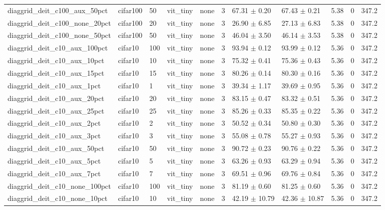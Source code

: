 \begin{tabular}{lllllllllll}
diaggrid_deit_c100_aux_50pct & cifar100 & 50 & vit_tiny & none & 3 & 67.31 $\pm$ 0.20 & 67.43 $\pm$ 0.21 & 5.38 & 0 & 347.2 \\
diaggrid_deit_c100_none_20pct & cifar100 & 20 & vit_tiny & none & 3 & 26.90 $\pm$ 6.85 & 27.13 $\pm$ 6.83 & 5.38 & 0 & 347.2 \\
diaggrid_deit_c100_none_50pct & cifar100 & 50 & vit_tiny & none & 3 & 46.04 $\pm$ 3.50 & 46.14 $\pm$ 3.53 & 5.38 & 0 & 347.2 \\
diaggrid_deit_c10_aux_100pct & cifar10 & 100 & vit_tiny & none & 3 & 93.94 $\pm$ 0.12 & 93.99 $\pm$ 0.12 & 5.36 & 0 & 347.2 \\
diaggrid_deit_c10_aux_10pct & cifar10 & 10 & vit_tiny & none & 3 & 75.32 $\pm$ 0.41 & 75.36 $\pm$ 0.43 & 5.36 & 0 & 347.2 \\
diaggrid_deit_c10_aux_15pct & cifar10 & 15 & vit_tiny & none & 3 & 80.26 $\pm$ 0.14 & 80.30 $\pm$ 0.16 & 5.36 & 0 & 347.2 \\
diaggrid_deit_c10_aux_1pct & cifar10 & 1 & vit_tiny & none & 3 & 39.34 $\pm$ 1.17 & 39.69 $\pm$ 0.95 & 5.36 & 0 & 347.2 \\
diaggrid_deit_c10_aux_20pct & cifar10 & 20 & vit_tiny & none & 3 & 83.15 $\pm$ 0.47 & 83.32 $\pm$ 0.51 & 5.36 & 0 & 347.2 \\
diaggrid_deit_c10_aux_25pct & cifar10 & 25 & vit_tiny & none & 3 & 85.26 $\pm$ 0.33 & 85.35 $\pm$ 0.22 & 5.36 & 0 & 347.2 \\
diaggrid_deit_c10_aux_2pct & cifar10 & 2 & vit_tiny & none & 3 & 50.52 $\pm$ 0.34 & 50.80 $\pm$ 0.30 & 5.36 & 0 & 347.2 \\
diaggrid_deit_c10_aux_3pct & cifar10 & 3 & vit_tiny & none & 3 & 55.08 $\pm$ 0.78 & 55.27 $\pm$ 0.93 & 5.36 & 0 & 347.2 \\
diaggrid_deit_c10_aux_50pct & cifar10 & 50 & vit_tiny & none & 3 & 90.72 $\pm$ 0.23 & 90.76 $\pm$ 0.22 & 5.36 & 0 & 347.2 \\
diaggrid_deit_c10_aux_5pct & cifar10 & 5 & vit_tiny & none & 3 & 63.26 $\pm$ 0.93 & 63.29 $\pm$ 0.94 & 5.36 & 0 & 347.2 \\
diaggrid_deit_c10_aux_7pct & cifar10 & 7 & vit_tiny & none & 3 & 69.51 $\pm$ 0.96 & 69.76 $\pm$ 0.84 & 5.36 & 0 & 347.2 \\
diaggrid_deit_c10_none_100pct & cifar10 & 100 & vit_tiny & none & 3 & 81.19 $\pm$ 0.60 & 81.25 $\pm$ 0.60 & 5.36 & 0 & 347.2 \\
diaggrid_deit_c10_none_10pct & cifar10 & 10 & vit_tiny & none & 3 & 42.19 $\pm$ 10.79 & 42.36 $\pm$ 10.87 & 5.36 & 0 & 347.2 \\

\end{tabular}
